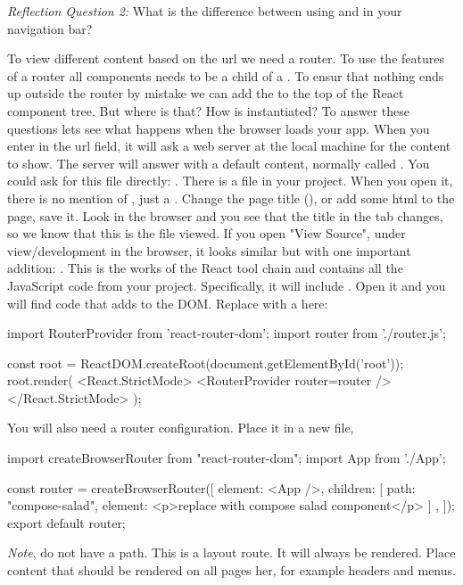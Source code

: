 \documentclass[fleqn, article, a4paper]{memoir}
\begin{document}
\begin{Assignments}
\noindent \emph{Reflection Question 2:} What is the difference between using  and  in your navigation bar?

\item To view different content based on the url we need a router. To use the features of a router all components needs to be a child of a . To ensur that nothing ends up outside the router by mistake we can add the  to the top of the React component tree. But where is that? How is  instantiated? To answer these questions lets see what happens when the browser loads your app. When you enter  in the url field, it will ask a web server at the local machine for the content to show. The server will answer with a default content, normally called . You could ask for this file directly: . There is a  file in your project. When you open it, there is no mention of , just a . Change the page title (), or add some html to the page, save it. Look in the browser and you see that the title in the tab changes, so we know that this is the file viewed. If you open "View Source", under view/development in the browser, it looks similar but with one important addition: . This is the works of the React tool chain and  contains all the JavaScript code from your project. Specifically, it will include . Open it and you will find code that adds  to the DOM. Replace  with a  here:

\begin{Code}
import { RouterProvider } from 'react-router-dom';
import router from './router.js';

const root = ReactDOM.createRoot(document.getElementById('root'));
root.render(
  <React.StrictMode>
    <RouterProvider router={router} />
  </React.StrictMode>
);
\end{Code}

\noindent You will also need a router configuration. Place it in a new file, 
\begin{Code}
import { createBrowserRouter } from "react-router-dom";
import App from './App';

const router = createBrowserRouter([
  {
    element: <App />,
    children: [
      {
        path: "compose-salad",
        element: <p>replace with compose salad component</p>
      }]
  },
]);
export default router;
\end{Code}
\noindent \emph{Note},  do not have a path. This is a layout route. It will always be rendered. Place content that should be rendered on all pages her, for example headers and menus.


\end{Assignments}
\end{document}
